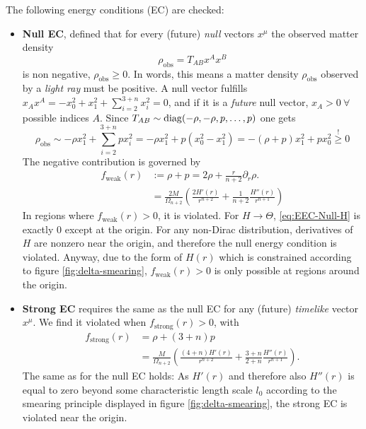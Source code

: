 \documentclass[12pt,a4paper]{report}
\numberwithin{equation}{chapter}
\begin{document}
\clearpage %
The following energy conditions (EC) are checked:
%
\begin{itemize}
\item {\bf Null EC}, defined that for every (future) \emph{null} vectors $x^\mu$ the observed matter density
\begin{equation}
\rho_\text{obs} = T_{AB} x^A x^B
\end{equation}
is non negative, $\rho_\text{obs} \geq 0$. In words, this means a matter density $\rho_\text{obs}$ observed by a \emph{light ray} must be positive. A null vector fulfills $x_A x^A = - x_0^2 + x_1^2 + \sum_{i=2}^{3+n} x_i^2 = 0$, and if it is a \emph{future} null vector, $x_A>0~\forall$ possible indices $A$. Since $T_{AB} \sim \operatorname{diag}(-\rho, -\rho, p,\dots, p)$ one gets
\begin{equation}
\rho_\text{obs} \sim -\rho x_1^2 + \sum_{i=2}^{3+n} p x_i^2
= -\rho x_1^2 + p (x_0^2 - x_1^2) = -(\rho + p) x_1^2 + p x_0^2
\stackrel{!}{\geq} 0
\end{equation}
The negative contribution is governed by
\begin{subequations}
\begin{align}
f_\text{weak}(r) &:= \rho + p = 2\rho + \frac{r}{n+2} \partial_r \rho.
\\
\label{eq:EEC-Null-H}
&= \frac{2 M}{\Omega_{n+2}}
\left(
\frac{2 H'(r)}{r^{n+2}} + \frac{1}{n+2} \frac{H''(r)}{r^{n+1}}
\right)
\end{align}
\end{subequations}
In regions where $f_\text{weak}(r)>0$, it is violated. For $H\to\Theta$, \eqref{eq:EEC-Null-H} is exactly $0$ except at the origin. For any non-Dirac distribution, derivatives of $H$ are nonzero near the origin, and therefore the null energy condition is violated. Anyway, due to the form of $H(r)$ which is constrained according to figure \ref{fig:delta-smearing}, $f_\text{weak}(r)>0$ is only possible at regions around the origin.

\item {\bf Strong EC} requires the same as the null EC for any (future) \emph{timelike} vector $x^\mu$. We find it violated when $f_\text{strong}(r) > 0$, with
\begin{subequations}
\begin{align}
f_\text{strong}(r) &= \rho + (3+n) p \\
&= \frac{M}{\Omega_{n+2}}
\left( \frac{(4+n) H'(r)}{r^{n+2}} + \frac{3+n}{2+n} \frac{H''(r)}{r^{n+1}} \right).
\end{align}
\end{subequations}
The same as for the null EC holds: As $H'(r)$ and therefore also $H''(r)$ is equal to zero beyond some characteristic length scale $l_0$ according to the smearing principle displayed in figure \ref{fig:delta-smearing}, the strong EC is violated near the origin.


\end{itemize}
\end{document}
